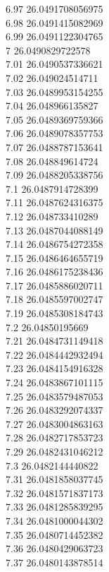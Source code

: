 {6.97	26.0491708056975\\
6.98	26.0491415082969\\
6.99	26.0491122304765\\
7	26.0490829722578\\
7.01	26.0490537336621\\
7.02	26.049024514711\\
7.03	26.0489953154255\\
7.04	26.048966135827\\
7.05	26.0489369759366\\
7.06	26.0489078357753\\
7.07	26.0488787153641\\
7.08	26.048849614724\\
7.09	26.0488205338756\\
7.1	26.0487914728399\\
7.11	26.0487624316375\\
7.12	26.048733410289\\
7.13	26.0487044088149\\
7.14	26.0486754272358\\
7.15	26.0486464655719\\
7.16	26.0486175238436\\
7.17	26.0485886020711\\
7.18	26.0485597002747\\
7.19	26.0485308184743\\
7.2	26.04850195669\\
7.21	26.0484731149418\\
7.22	26.0484442932494\\
7.23	26.0484154916328\\
7.24	26.0483867101115\\
7.25	26.0483579487053\\
7.26	26.0483292074337\\
7.27	26.0483004863163\\
7.28	26.0482717853723\\
7.29	26.0482431046212\\
7.3	26.0482144440822\\
7.31	26.0481858037745\\
7.32	26.0481571837173\\
7.33	26.0481285839295\\
7.34	26.0481000044302\\
7.35	26.0480714452382\\
7.36	26.0480429063723\\
7.37	26.0480143878514\\
}

